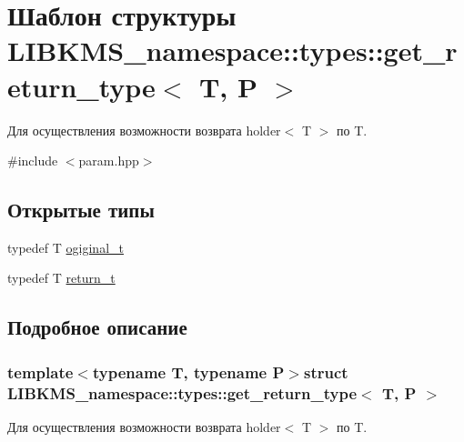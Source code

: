 \hypertarget{structLIBKMS__namespace_1_1types_1_1get__return__type}{\section{Шаблон структуры L\-I\-B\-K\-M\-S\-\_\-namespace\-:\-:types\-:\-:get\-\_\-return\-\_\-type$<$ T, P $>$}
\label{structLIBKMS__namespace_1_1types_1_1get__return__type}
}


Для осуществления возможности возврата holder$<$ T $>$ по T.  




{\ttfamily \#include $<$param.\-hpp$>$}

\subsection*{Открытые типы}
\begin{DoxyCompactItemize}
\item 
typedef T \hyperlink{structLIBKMS__namespace_1_1types_1_1get__return__type_a599165be1e050dd76942eb69e5a24319}{ogiginal\-\_\-t}
\item 
typedef T \hyperlink{structLIBKMS__namespace_1_1types_1_1get__return__type_ac549f484335955f84d86be6a644198e2}{return\-\_\-t}
\end{DoxyCompactItemize}


\subsection{Подробное описание}
\subsubsection*{template$<$typename T, typename P$>$struct L\-I\-B\-K\-M\-S\-\_\-namespace\-::types\-::get\-\_\-return\-\_\-type$<$ T, P $>$}

Для осуществления возможности возврата holder$<$ T $>$ по T. 

